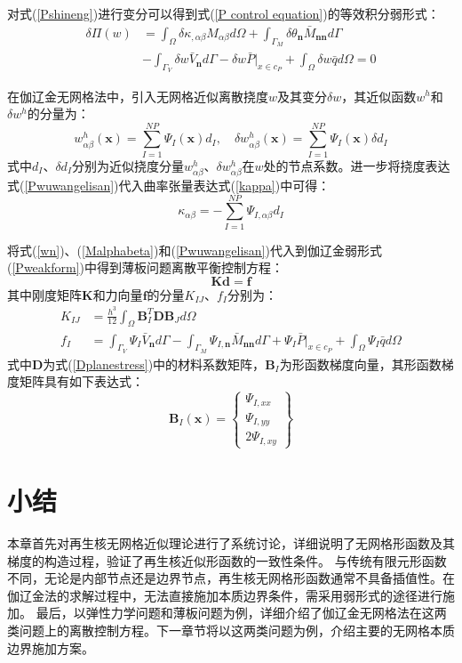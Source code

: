 对式(\ref{Pshineng})进行变分可以得到式(\ref{P control equation})的等效积分弱形式：
\begin{equation}\label{Pweakform}
\begin{split}
        \delta\Pi(w)&=\int_{\Omega}\delta\kappa_{,\alpha\beta}M_{\alpha\beta}d\Omega+\int_{\Gamma_M}\delta\theta_{\pmb{n}}\bar{M}_{\pmb{nn}}d\Gamma\\
        &-\int_{\Gamma_V}\delta w\bar{V}_{\pmb{n}}d\Gamma-\delta w\bar{P}\vert_{x\in c_P}+\int_{\Omega}\delta w\bar{q}d\Omega=0
\end{split}
\end{equation}\par
在伽辽金无网格法中，引入无网格近似离散挠度$w$及其变分$\delta w$，其近似函数$w^h$和$\delta w^h$的分量为：
\begin{equation}
\label{Pwuwangelisan}
    w_{\alpha\beta}^h(\pmb{x})=\sum_{I=1}^{N\!P}\Psi_I(\pmb{x})d_I,\quad \delta w_{\alpha\beta}^h(\pmb{x})=\sum_{I=1}^{N\!P}\Psi_I(\pmb{x})\delta d_I
\end{equation}
式中$d_I$、$\delta d_I$分别为近似挠度分量$w_{\alpha\beta}^h$、$\delta w_{\alpha\beta}^h$在$w$处的节点系数。进一步将挠度表达式(\ref{Pwuwangelisan})代入曲率张量表达式(\ref{kappa})中可得：
\begin{equation}
\kappa_{\alpha\beta}=-\sum_{I=1}^{N\!P}\Psi_{I,\alpha\beta}d_I
\end{equation}\par
将式(\ref{wn})、(\ref{Malphabeta})和(\ref{Pwuwangelisan})代入到伽辽金弱形式(\ref{Pweakform})中得到薄板问题离散平衡控制方程：
\begin{equation}
     \pmb{K}\pmb{d}=\pmb{f}
\end{equation}
其中刚度矩阵$\boldsymbol K$和力向量$\pmb f$的分量$K_{IJ}$、$f_I$分别为：
\begin{subequations}\label{PKf}
\begin{align}
    \label{PKf1}K_{IJ}&=\frac{h^3}{12}\int_{\Omega}\pmb{B}^T_I\pmb{D}\pmb{B}_Jd\Omega\\
    \label{PKf2}f_I&=\int_{\Gamma_V}\Psi_I\bar{V}_{\pmb{n}}d\Gamma-\int_{\Gamma_M}\Psi_{I,\pmb{n}}\bar{M}_{\pmb{nn}}d\Gamma+\Psi_I\bar{P}\vert_{x\in c_P}+\int_{\Omega}\Psi_I\bar{q}d\Omega
\end{align}
\end{subequations}
式中$\pmb{D}$为式(\ref{Dplanestress})中的材料系数矩阵，$\pmb{B}_I$为形函数梯度向量，其形函数梯度矩阵具有如下表达式：
\begin{equation}
\pmb{B}_I(\pmb{x})= \begin{Bmatrix}\Psi_{I,xx}\\\Psi_{I,yy}\\2\Psi_{I,xy}\end{Bmatrix} 
\end{equation}
\section{小结}
本章首先对再生核无网格近似理论进行了系统讨论，详细说明了无网格形函数及其梯度的构造过程，验证了再生核近似形函数的一致性条件。
与传统有限元形函数不同，无论是内部节点还是边界节点，再生核无网格形函数通常不具备插值性。在伽辽金法的求解过程中，无法直接施加本质边界条件，需采用弱形式的途径进行施加。
最后，以弹性力学问题和薄板问题为例，详细介绍了伽辽金无网格法在这两类问题上的离散控制方程。下一章节将以这两类问题为例，介绍主要的无网格本质边界施加方案。
